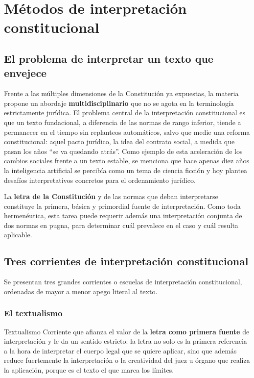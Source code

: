\documentclass[12pt,oneside]{book}
\begin{document}
\chapter{Métodos de interpretación constitucional}

\section{El problema de interpretar un texto que envejece}

Frente a las múltiples dimensiones de la Constitución ya expuestas, la materia propone un abordaje \textbf{multidisciplinario} que no se agota en la terminología estrictamente jurídica. El problema central de la interpretación constitucional es que un texto fundacional, a diferencia de las normas de rango inferior, tiende a permanecer en el tiempo sin replanteos automáticos, salvo que medie una reforma constitucional: aquel pacto jurídico, la idea del contrato social, a medida que pasan los años ``se va quedando atrás''. Como ejemplo de esta aceleración de los cambios sociales frente a un texto estable, se menciona que hace apenas diez años la inteligencia artificial se percibía como un tema de ciencia ficción y hoy plantea desafíos interpretativos concretos para el ordenamiento jurídico.

La \textbf{letra de la Constitución} y de las normas que deban interpretarse constituye la primera, básica y primordial fuente de interpretación. Como toda hermenéutica, esta tarea puede requerir además una interpretación conjunta de dos normas en pugna, para determinar cuál prevalece en el caso y cuál resulta aplicable.

\section{Tres corrientes de interpretación constitucional}

Se presentan tres grandes corrientes o escuelas de interpretación constitucional, ordenadas de mayor a menor apego literal al texto.

\subsection{El textualismo}

\begin{definition}{Textualismo}
Corriente que afianza el valor de la \textbf{letra como primera fuente} de interpretación y le da un sentido estricto: la letra no solo es la primera referencia a la hora de interpretar el cuerpo legal que se quiere aplicar, sino que además reduce fuertemente la interpretación o la creatividad del juez u órgano que realiza la aplicación, porque es el texto el que marca los límites.
\end{definition}
\end{document}

